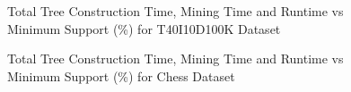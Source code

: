             \begin{figure}[h]
            \centering
                
                
                
            \caption{Total Tree Construction Time, Mining Time and Runtime vs Minimum Support (\%) for T40I10D100K Dataset }
            \label{result:g_t10_tree_construction_total}
            \end{figure}
            
            
    
            \begin{figure}[h]
            \centering
                
                
                
            \caption{Total Tree Construction Time, Mining Time and Runtime vs Minimum Support (\%) for Chess Dataset }
            \label{result:g_chess_tree_construction_total}
            \end{figure}
            
